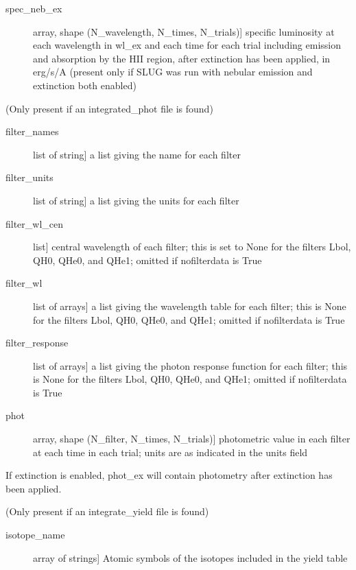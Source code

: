 \documentclass[letterpaper,10pt,english]{sphinxmanual}
\begin{document}
\begin{fulllineitems}
\begin{description}
\begin{description}
\item[{spec\_neb\_ex}] \leavevmode{[}array, shape (N\_wavelength, N\_times, N\_trials){]}
specific luminosity at each wavelength in wl\_ex and each
time for each trial including emission and absorption by the
HII region, after extinction has been applied, in erg/s/A
(present only if SLUG was run with nebular emission and
extinction both enabled)

\end{description}

(Only present if an integrated\_phot file is found)
\begin{description}
\item[{filter\_names}] \leavevmode{[}list of string{]}
a list giving the name for each filter

\item[{filter\_units}] \leavevmode{[}list of string{]}
a list giving the units for each filter

\item[{filter\_wl\_cen}] \leavevmode{[}list{]}
central wavelength of each filter; this is set to None for the
filters Lbol, QH0, QHe0, and QHe1; omitted if nofilterdata is
True

\item[{filter\_wl}] \leavevmode{[}list of arrays{]}
a list giving the wavelength table for each filter; this is
None for the filters Lbol, QH0, QHe0, and QHe1; omitted if
nofilterdata is True

\item[{filter\_response}] \leavevmode{[}list of arrays{]}
a list giving the photon response function for each filter;
this is None for the filters Lbol, QH0, QHe0, and QHe1; omitted
if nofilterdata is True

\item[{phot}] \leavevmode{[}array, shape (N\_filter, N\_times, N\_trials){]}
photometric value in each filter at each time in each trial;
units are as indicated in the units field

\end{description}

If extinction is enabled, phot\_ex will contain photometry  
after extinction has been applied.

(Only present if an integrate\_yield file is found)
\begin{description}
\item[{isotope\_name}] \leavevmode{[}array of strings{]}
Atomic symbols of the isotopes included in the yield table


\end{description}
\end{description}
\end{fulllineitems}
\end{document}
